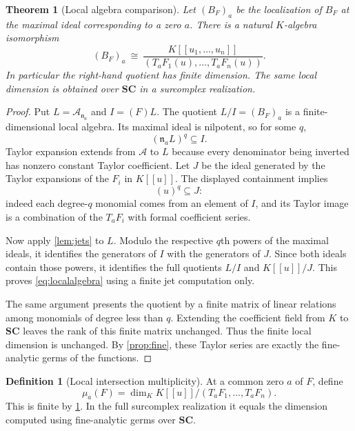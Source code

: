 \documentclass[11pt,letterpaper]{article}
\newtheorem{theorem}{Theorem}[section]
\theoremstyle{definition}
\newtheorem{definition}[definition]{Definition}
\theoremstyle{remark}
\newcommand{\SC}{\mathbf{SC}}
\newcommand{\A}{\mathscr A}
\newcommand{\nn}{\mathfrak n}
\numberwithin{equation}{section}
\begin{document}
\begin{theorem}[Local algebra comparison]\label{thm:localalgebra}
Let $(B_F)_a$ be the localization of $B_F$ at the maximal ideal corresponding to a zero $a$. There is a natural $K$-algebra isomorphism
\begin{equation}\label{eq:localalgebra}
 (B_F)_a\ \cong\
 \frac{K[[u_1,\ldots,u_n]]}{(T_aF_1(u),\ldots,T_aF_n(u))}.
\end{equation}
In particular the right-hand quotient has finite dimension. The same local dimension is obtained over $\SC$ in a surcomplex realization.
\end{theorem}
\begin{proof}
Put $L=\A_{\nn_a}$ and $I=(F)L$. The quotient $L/I=(B_F)_a$ is a finite-dimensional local algebra. Its maximal ideal is nilpotent, so for some $q$,
\[
 (\nn_aL)^q\subseteq I.
\]
Taylor expansion extends from $\A$ to $L$ because every denominator being inverted has nonzero constant Taylor coefficient. Let $J$ be the ideal generated by the Taylor expansions of the $F_i$ in $K[[u]]$. The displayed containment implies
\[
 (u)^q\subseteq J:
\]
indeed each degree-$q$ monomial comes from an element of $I$, and its Taylor image is a combination of the $T_aF_i$ with formal coefficient series.

Now apply \cref{lem:jets} to $L$. Modulo the respective $q$th powers of the maximal ideals, it identifies the generators of $I$ with the generators of $J$. Since both ideals contain those powers, it identifies the full quotients $L/I$ and $K[[u]]/J$. This proves \eqref{eq:localalgebra} using a finite jet computation only.

The same argument presents the quotient by a finite matrix of linear relations among monomials of degree less than $q$. Extending the coefficient field from $K$ to $\SC$ leaves the rank of this finite matrix unchanged. Thus the finite local dimension is unchanged. By \cref{prop:fine}, these Taylor series are exactly the fine-analytic germs of the functions.
\end{proof}

\begin{definition}[Local intersection multiplicity]
At a common zero $a$ of $F$, define
\[
 \mu_a(F)=\dim_K K[[u]]/(T_aF_1,\ldots,T_aF_n).
\]
This is finite by \cref{thm:localalgebra}. In the full surcomplex realization it equals the dimension computed using fine-analytic germs over $\SC$.
\end{definition}
\end{document}
